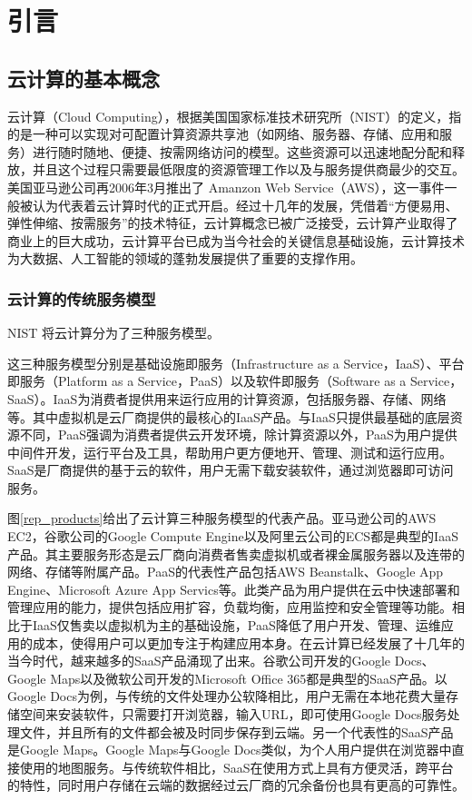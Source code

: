 
\chapter{引言}

\section{云计算的基本概念}

云计算（Cloud Computing），根据美国国家标准技术研究所（NIST）的定义，指的是一种可以实现对可配置计算资源共享池（如网络、服务器、存储、应用和服务）进行随时随地、便捷、按需网络访问的模型。这些资源可以迅速地配分配和释放，并且这个过程只需要最低限度的资源管理工作以及与服务提供商最少的交互。美国亚马逊公司再2006年3月推出了 Amanzon Web Service（AWS）\parencite{aws}，这一事件一般被认为代表着云计算时代的正式开启。经过十几年的发展，凭借着“方便易用、弹性伸缩、按需服务”的技术特征，云计算概念已被广泛接受，云计算产业取得了商业上的巨大成功，云计算平台已成为当今社会的关键信息基础设施，云计算技术为大数据、人工智能的领域的蓬勃发展提供了重要的支撑作用。

\subsection{云计算的传统服务模型}

NIST 将云计算分为了三种服务模型。

这三种服务模型分别是基础设施即服务（Infrastructure as a Service，IaaS）、平台即服务（Platform as a Service，PaaS）以及软件即服务（Software as a Service，SaaS）。IaaS为消费者提供用来运行应用的计算资源，包括服务器、存储、网络等。其中虚拟机是云厂商提供的最核心的IaaS产品。与IaaS只提供最基础的底层资源不同，PaaS强调为消费者提供云开发环境，除计算资源以外，PaaS为用户提供中间件开发，运行平台及工具，帮助用户更方便地开、管理、测试和运行应用。SaaS是厂商提供的基于云的软件，用户无需下载安装软件，通过浏览器即可访问服务。

图\ref{rep_products}给出了云计算三种服务模型的代表产品。亚马逊公司的AWS EC2\parencite{awsec2}，谷歌公司的Google Compute Engine\parencite{googlecloud}以及阿里云公司的ECS\parencite{aliecs}都是典型的IaaS产品。其主要服务形态是云厂商向消费者售卖虚拟机或者裸金属服务器以及连带的网络、存储等附属产品。PaaS的代表性产品包括AWS Beanstalk、Google App Engine、Microsoft Azure App Servics等。此类产品为用户提供在云中快速部署和管理应用的能力，提供包括应用扩容，负载均衡，应用监控和安全管理等功能。相比于IaaS仅售卖以虚拟机为主的基础设施，PaaS降低了用户开发、管理、运维应用的成本，使得用户可以更加专注于构建应用本身。在云计算已经发展了十几年的当今时代，越来越多的SaaS产品涌现了出来。谷歌公司开发的Google Docs、Google Maps以及微软公司开发的Microsoft Office 365都是典型的SaaS产品。以Google Docs为例，与传统的文件处理办公软降相比，用户无需在本地花费大量存储空间来安装软件，只需要打开浏览器，输入URL，即可使用Google Docs服务处理文件，并且所有的文件都会被及时同步保存到云端。另一个代表性的SaaS产品是Google Maps。Google Maps与Google Docs类似，为个人用户提供在浏览器中直接使用的地图服务。与传统软件相比，SaaS在使用方式上具有方便灵活，跨平台的特性，同时用户存储在云端的数据经过云厂商的冗余备份也具有更高的可靠性。

